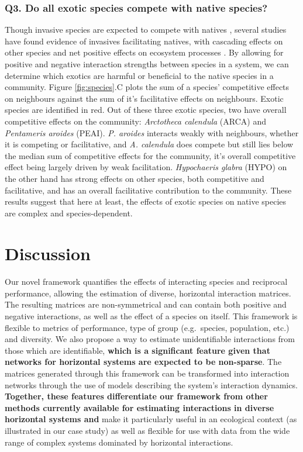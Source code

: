 \documentclass[a4,12pt]{article}
\begin{document}
\begin{refsection}
    \subsubsection*{Q3. Do all exotic species compete with native species?}
    Though invasive species are expected to compete with natives \parencite{Naeem2000, Corbin2004, Riley2008, Zheng2015}, several studies have found evidence of invasives facilitating natives, with cascading effects on other species and net positive effects on ecosystem processes \parencite{Rodriguez2006, Ramus2017, Wainwright2019}. By allowing for positive and negative interaction strengths between species in a system, we can determine which exotics are harmful or beneficial to the native species in a community. Figure \ref{fig:species}.C plots the sum of a species' competitive effects on neighbours against the sum of it's facilitative effects on neighbours. Exotic species are identified in red. Out of these three exotic species, two have overall competitive effects on the community: \textit{Arctotheca calendula} (ARCA) and \textit{Pentameris aroides} (PEAI). \textit{P. aroides} interacts weakly with neighbours, whether it is competing or facilitative, and \textit{A. calendula} does compete but still lies below the median sum of competitive effects for the community, it's overall competitive effect being largely driven by weak facilitation. \textit{Hypochaeris glabra} (HYPO) on the other hand has strong effects on other species, both competitive and facilitative, and has an overall facilitative contribution to the community. These results suggest that here at least, the effects of exotic species on native species are complex and species-dependent.


\section{Discussion}


    \paragraph{} 
    Our novel framework quantifies the effects of interacting species and reciprocal performance, allowing the estimation of diverse, horizontal interaction matrices. The resulting matrices are non-symmetrical and can contain both positive and negative interactions, as well as the effect of a species on itself. This framework is flexible to metrics of performance, type of group (e.g.\ species, population, etc.) and diversity. We also propose a way to estimate unidentifiable interactions from those which are identifiable, \textbf{which is a significant feature given that networks for horizontal systems are expected to be non-sparse}. The matrices generated through this framework can be transformed into interaction networks through the use of models describing the system's interaction dynamics. \textbf{Together, these features differentiate our framework from other methods currently available for estimating interactions in diverse horizontal systems and} make it particularly useful in an ecological context (as illustrated in our case study) as well as flexible for use with data from the wide range of complex systems dominated by horizontal interactions.


\end{refsection}
\end{document}
